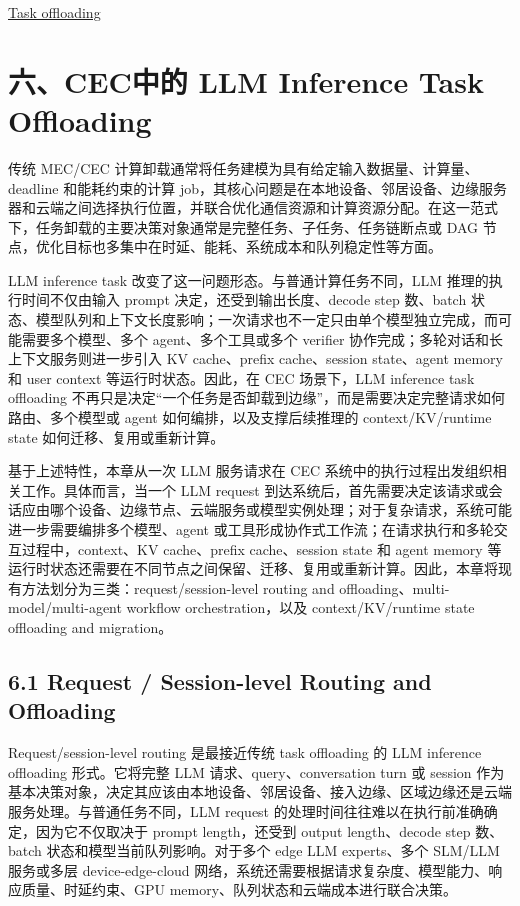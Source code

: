 \documentclass[a4paper,twocolumn,10pt]{ctexart}
\begin{document}
\href{https://tcnh03o5qwao.feishu.cn/docx/Mj3qdPuO7oQCldxARhsc9IkSnBg}{Task offloading}


\section{六、CEC中的 LLM Inference Task Offloading}

传统 MEC/CEC 计算卸载通常将任务建模为具有给定输入数据量、计算量、deadline 和能耗约束的计算 job，其核心问题是在本地设备、邻居设备、边缘服务器和云端之间选择执行位置，并联合优化通信资源和计算资源分配。在这一范式下，任务卸载的主要决策对象通常是完整任务、子任务、任务链断点或 DAG 节点，优化目标也多集中在时延、能耗、系统成本和队列稳定性等方面。


LLM inference task 改变了这一问题形态。与普通计算任务不同，LLM 推理的执行时间不仅由输入 prompt 决定，还受到输出长度、decode step 数、batch 状态、模型队列和上下文长度影响；一次请求也不一定只由单个模型独立完成，而可能需要多个模型、多个 agent、多个工具或多个 verifier 协作完成；多轮对话和长上下文服务则进一步引入 KV cache、prefix cache、session state、agent memory 和 user context 等运行时状态。因此，在 CEC 场景下，LLM inference task offloading 不再只是决定“一个任务是否卸载到边缘”，而是需要决定完整请求如何路由、多个模型或 agent 如何编排，以及支撑后续推理的 context/KV/runtime state 如何迁移、复用或重新计算。


基于上述特性，本章从一次 LLM 服务请求在 CEC 系统中的执行过程出发组织相关工作。具体而言，当一个 LLM request 到达系统后，首先需要决定该请求或会话应由哪个设备、边缘节点、云端服务或模型实例处理；对于复杂请求，系统可能进一步需要编排多个模型、agent 或工具形成协作式工作流；在请求执行和多轮交互过程中，context、KV cache、prefix cache、session state 和 agent memory 等运行时状态还需要在不同节点之间保留、迁移、复用或重新计算。因此，本章将现有方法划分为三类：request/session-level routing and offloading、multi-model/multi-agent workflow orchestration，以及 context/KV/runtime state offloading and migration。




\subsection{6.1 Request / Session-level Routing and Offloading}

Request/session-level routing 是最接近传统 task offloading 的 LLM inference offloading 形式。它将完整 LLM 请求、query、conversation turn 或 session 作为基本决策对象，决定其应该由本地设备、邻居设备、接入边缘、区域边缘还是云端服务处理。与普通任务不同，LLM request 的处理时间往往难以在执行前准确确定，因为它不仅取决于 prompt length，还受到 output length、decode step 数、batch 状态和模型当前队列影响。对于多个 edge LLM experts、多个 SLM/LLM 服务或多层 device-edge-cloud 网络，系统还需要根据请求复杂度、模型能力、响应质量、时延约束、GPU memory、队列状态和云端成本进行联合决策。
\end{document}
